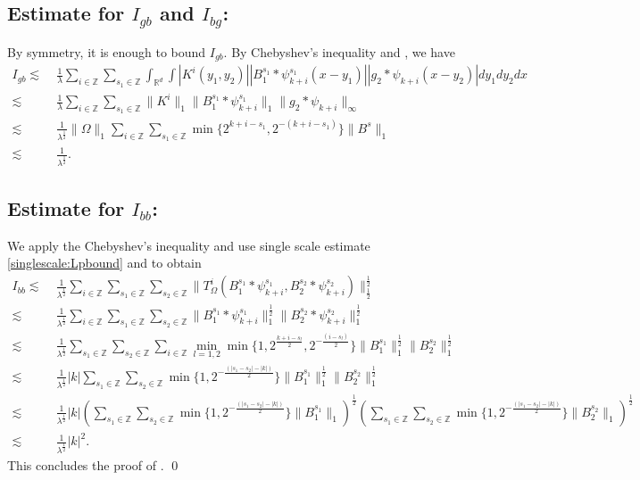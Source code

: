 \documentclass[a4paper,reqno]{amsart}
\newcommand{\R}{{\mathbb R}}       %
\newcommand{\Z}{{\mathbb Z}}
\theoremstyle{definition}
\numberwithin{equation}{section}
\begin{document}
	\subsection*{Estimate for $I_{gb}$ and $I_{bg}$:} By symmetry, it is enough to bound $I_{gb}$. By Chebyshev's inequality and , we have
	\begin{align*}
		I_{gb}\lesssim&\;\frac{1}{\lambda}\sum_{i\in\Z}\sum_{s_1\in\Z}\int_{\R^d}\int |K^i(y_1,y_2)||B_1^{s_1}*\psi_{k+i}^{s_1}(x-y_1)||g_2*\psi_{k+i}(x-y_2)|dy_1dy_2dx\\
		\lesssim&\;\frac{1}{\lambda}\sum_{i\in\Z}\sum_{s_1\in\Z}\|K^i\|_1\|B_1^{s_1}*\psi_{k+i}^{s_1}\|_1\|g_2*\psi_{k+i}\|_\infty\\
		\lesssim&\;\frac{1}{\lambda^\frac{1}{2}}\|\Omega\|_1\sum_{i\in\Z}\sum_{s_1\in\Z}\min\{2^{k+i-s_1},2^{-(k+i-s_1)}\}\|B^s\|_1\\
		\lesssim&\;\frac{1}{\lambda^\frac{1}{2}}.
	\end{align*}
	\subsection*{Estimate for $I_{bb}$:} We apply the Chebyshev's inequality and use  single scale estimate \eqref{singlescale:Lpbound} and  to obtain
	\begin{align*}
		I_{bb}\lesssim&\;\frac{1}{\lambda^\frac{1}{2}}\sum_{i\in\Z}\sum_{s_1\in\Z}\sum_{s_2\in\Z}\|T^i_\Omega(B_1^{s_1}*\psi_{k+i}^{s_1},B_2^{s_2}*\psi_{k+i}^{s_2})\|_\frac{1}{2}^\frac{1}{2}\\
		\lesssim&\;\frac{1}{\lambda^\frac{1}{2}}\sum_{i\in\Z}\sum_{s_1\in\Z}\sum_{s_2\in\Z}\|B_1^{s_1}*\psi_{k+i}^{s_1}\|_1^\frac{1}{2}\|B_2^{s_2}*\psi_{k+i}^{s_2}\|_1^\frac{1}{2}\\
		\lesssim&\;\frac{1}{\lambda^\frac{1}{2}}\sum_{s_1\in\Z}\sum_{s_2\in\Z}\sum_{i\in\Z}\min_{l=1,2}\min\{1,2^{\frac{k+i-s_l}{2}},2^{-\frac{(i-s_l)}{2}}\}\|B_1^{s_1}\|_1^\frac{1}{2}\|B_2^{s_2}\|_1^\frac{1}{2}\\
		\lesssim&\;\frac{1}{\lambda^\frac{1}{2}}|k|\sum_{s_1\in\Z}\sum_{s_2\in\Z}\min\{1,2^{-\frac{(|s_1-s_2|-|k|)}{2}}\}\|B_1^{s_1}\|_1^\frac{1}{2}\|B_2^{s_2}\|_1^\frac{1}{2}\\
		\lesssim&\;\frac{1}{\lambda^\frac{1}{2}}|k|\left(\sum_{s_1\in\Z}\sum_{s_2\in\Z}\min\{1,2^{-\frac{(|s_1-s_2|-|k|)}{2}}\}\|B_1^{s_1}\|_1\right)^\frac{1}{2}\left(\sum_{s_1\in\Z}\sum_{s_2\in\Z}\min\{1,2^{-\frac{(|s_1-s_2|-|k|)}{2}}\}\|B_2^{s_2}\|_1\right)^\frac{1}{2}\\
		\lesssim&\;\frac{1}{\lambda^\frac{1}{2}}|k|^2.
	\end{align*}
	This concludes the proof of .
\qed
\end{document}
